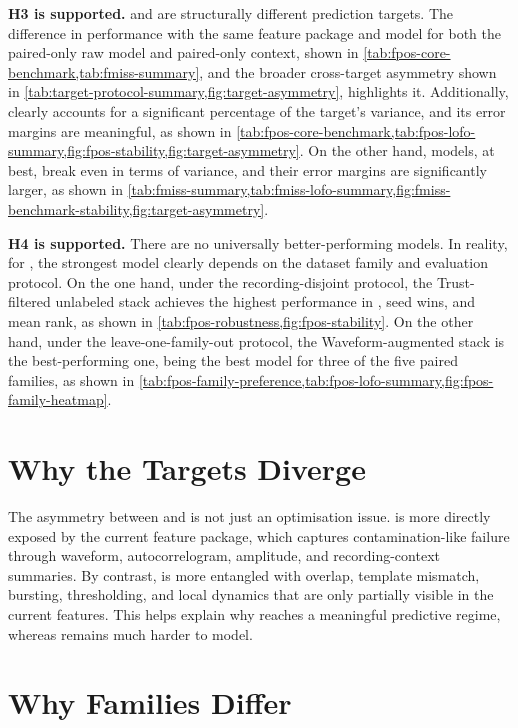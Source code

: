 \textbf{H3 is supported.} \fpos{} and \fmiss{} are structurally different prediction targets. The difference in performance with the same feature package and model for both the paired-only raw model and paired-only context, shown in \cref{tab:fpos-core-benchmark,tab:fmiss-summary}, and the broader cross-target asymmetry shown in \cref{tab:target-protocol-summary,fig:target-asymmetry}, highlights it. Additionally, \fpos{} clearly accounts for a significant percentage of the target's variance, and its error margins are meaningful, as shown in \cref{tab:fpos-core-benchmark,tab:fpos-lofo-summary,fig:fpos-stability,fig:target-asymmetry}. On the other hand, \fmiss{} models, at best, break even in terms of variance, and their error margins are significantly larger, as shown in \cref{tab:fmiss-summary,tab:fmiss-lofo-summary,fig:fmiss-benchmark-stability,fig:target-asymmetry}.

\textbf{H4 is supported.} There are no universally better-performing models. In reality, for \fpos{}, the strongest model clearly depends on the dataset family and evaluation protocol. On the one hand, under the recording-disjoint protocol, the Trust-filtered unlabeled stack achieves the highest performance in \mae{}, seed wins, and mean rank, as shown in \cref{tab:fpos-robustness,fig:fpos-stability}. On the other hand, under the leave-one-family-out protocol, the Waveform-augmented stack is the best-performing one, being the best model for three of the five paired families, as shown in \cref{tab:fpos-family-preference,tab:fpos-lofo-summary,fig:fpos-family-heatmap}.

\section{Why the Targets Diverge}

The asymmetry between \fpos{} and \fmiss{} is not just an optimisation issue. \fpos{} is more directly exposed by the current feature package, which captures contamination-like failure through waveform, autocorrelogram, amplitude, and recording-context summaries. By contrast, \fmiss{} is more entangled with overlap, template mismatch, bursting, thresholding, and local dynamics that are only partially visible in the current features. This helps explain why \fpos{} reaches a meaningful predictive regime, whereas \fmiss{} remains much harder to model.

\section{Why Families Differ}

